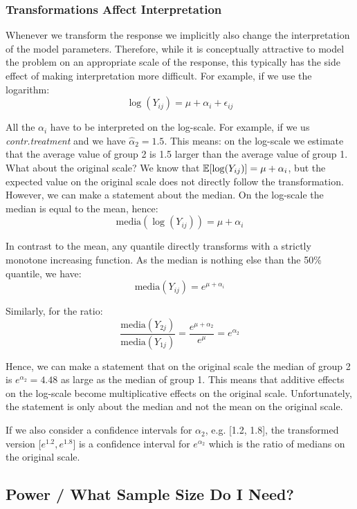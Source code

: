 \subsubsection{Transformations Affect Interpretation}

Whenever we transform the response we implicitly also change the interpretation of the model parameters. Therefore, while it is conceptually attractive to model the problem on an appropriate scale of the response, this typically has the side effect of making interpretation more difficult. For example, if we use the logarithm:
$$\log (Y_{ij}) = \mu + \alpha_i + \epsilon_{ij}$$

All the $\alpha_i$ have to be interpreted on the log-scale. For example, if we us \textit{contr.treatment} and we have $\hat \alpha_2 = 1.5$. This means: on the log-scale we estimate that the average value of group 2 is 1.5 larger than the average value of group 1. What about the original scale? We know that $\mathbb{E}[\log(Y_{ij})] = \mu + \alpha_i$, but the expected value on the original scale does not directly follow the transformation. However, we can make a statement about the median. On the log-scale the median is equal to the mean, hence:
$$\text{media}(\log(Y_{ij})) = \mu + \alpha_i$$

In contrast to the mean, any quantile directly transforms with a strictly monotone increasing function. As the median is nothing else than the 50\% quantile, we have:
$$\text{media}(Y_{ij}) = e^{\mu + \alpha_i}$$

Similarly, for the ratio:
$$\frac{\text{media}(Y_{2j})}{\text{media}(Y_{1j})} = \frac{e^{\mu + \alpha_2}}{e^{\mu}} = e^{\alpha_2}$$

Hence, we can make a statement that on the original scale the median of group 2 is $e^{\alpha_2} = 4.48$ as large as the median of group 1. This means that additive effects on the log-scale become multiplicative effects on the original scale. Unfortunately, the statement is only about the median and not the mean on the original scale. \medskip

If we also consider a confidence intervals for $\alpha_2$, e.g. [1.2, 1.8], the transformed version [$e^{1.2}, e^{1.8}$] is a confidence interval for $e^{\alpha_2}$ which is the ratio of medians on the original scale.

\subsection{Power / What Sample Size Do I Need?}

